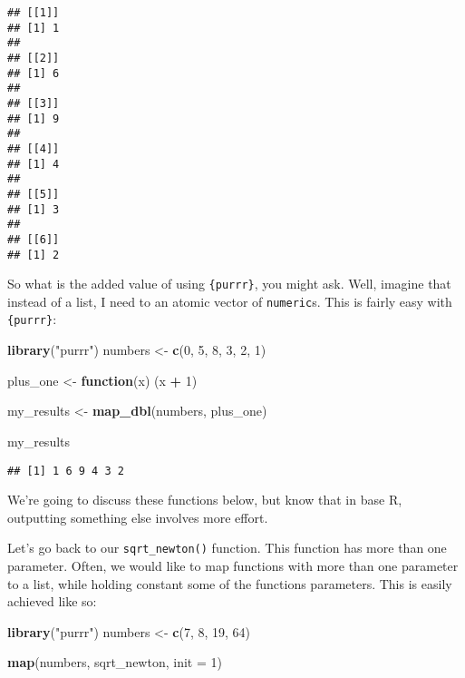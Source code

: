 \documentclass[
]{article}
\newenvironment{Shaded}{\begin{snugshade}}{\end{snugshade}}
\newcommand{\ControlFlowTok}[1]{\textcolor[rgb]{0.13,0.29,0.53}{\textbf{#1}}}
\newcommand{\DataTypeTok}[1]{\textcolor[rgb]{0.13,0.29,0.53}{#1}}
\newcommand{\DecValTok}[1]{\textcolor[rgb]{0.00,0.00,0.81}{#1}}
\newcommand{\KeywordTok}[1]{\textcolor[rgb]{0.13,0.29,0.53}{\textbf{#1}}}
\newcommand{\NormalTok}[1]{#1}
\newcommand{\OperatorTok}[1]{\textcolor[rgb]{0.81,0.36,0.00}{\textbf{#1}}}
\newcommand{\StringTok}[1]{\textcolor[rgb]{0.31,0.60,0.02}{#1}}
\begin{document}
\begin{verbatim}
## [[1]]
## [1] 1
## 
## [[2]]
## [1] 6
## 
## [[3]]
## [1] 9
## 
## [[4]]
## [1] 4
## 
## [[5]]
## [1] 3
## 
## [[6]]
## [1] 2
\end{verbatim}

So what is the added value of using \texttt{\{purrr\}}, you might ask. Well, imagine that instead of a list,
I need to an atomic vector of \texttt{numeric}s. This is fairly easy with \texttt{\{purrr\}}:

\begin{Shaded}
\begin{Highlighting}[]
\KeywordTok{library}\NormalTok{(}\StringTok{"purrr"}\NormalTok{)}
\NormalTok{numbers \textless{}{-}}\StringTok{ }\KeywordTok{c}\NormalTok{(}\DecValTok{0}\NormalTok{, }\DecValTok{5}\NormalTok{, }\DecValTok{8}\NormalTok{, }\DecValTok{3}\NormalTok{, }\DecValTok{2}\NormalTok{, }\DecValTok{1}\NormalTok{)}

\NormalTok{plus\_one \textless{}{-}}\StringTok{ }\ControlFlowTok{function}\NormalTok{(x) (x }\OperatorTok{+}\StringTok{ }\DecValTok{1}\NormalTok{)}

\NormalTok{my\_results \textless{}{-}}\StringTok{ }\KeywordTok{map\_dbl}\NormalTok{(numbers, plus\_one)}

\NormalTok{my\_results}
\end{Highlighting}
\end{Shaded}

\begin{verbatim}
## [1] 1 6 9 4 3 2
\end{verbatim}

We're going to discuss these functions below, but know that in base R, outputting something else
involves more effort.

Let's go back to our \texttt{sqrt\_newton()} function. This function has more than one parameter. Often,
we would like to map functions with more than one parameter to a list, while holding constant
some of the functions parameters. This is easily achieved like so:

\begin{Shaded}
\begin{Highlighting}[]
\KeywordTok{library}\NormalTok{(}\StringTok{"purrr"}\NormalTok{)}
\NormalTok{numbers \textless{}{-}}\StringTok{ }\KeywordTok{c}\NormalTok{(}\DecValTok{7}\NormalTok{, }\DecValTok{8}\NormalTok{, }\DecValTok{19}\NormalTok{, }\DecValTok{64}\NormalTok{)}

\KeywordTok{map}\NormalTok{(numbers, sqrt\_newton, }\DataTypeTok{init =} \DecValTok{1}\NormalTok{)}
\end{Highlighting}
\end{Shaded}
\end{document}
